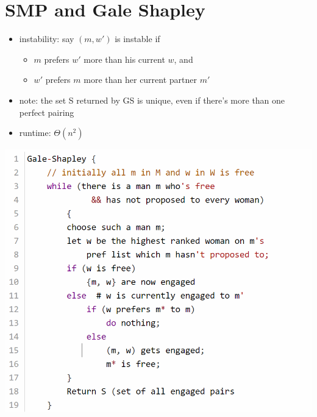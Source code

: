 \section*{SMP and Gale Shapley}
\begin{itemize} %
    \item instability: say $(m, w')$ is instable if 
    \begin{itemize}[leftmargin = 1em]
        \item $m$ prefers $w'$ more than his current $w$, and
        \item $w'$ prefers $m$ more than her current partner $m'$
    \end{itemize}
    \item note: the set S returned by GS is unique, even if 
    there's more than one perfect pairing
    \item runtime: $\Theta(n^2)$
\end{itemize}
\includegraphics[scale = 0.61]{pictures/gale-shapley code.png}

